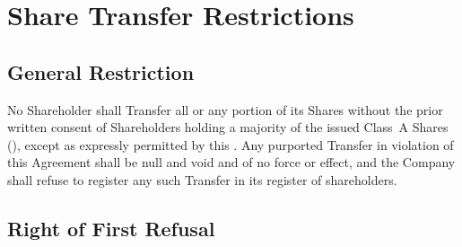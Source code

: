 
\section{Share Transfer Restrictions}
\label{sec:transfer}

\subsection{General Restriction}

No Shareholder shall Transfer all or any portion of its Shares without the prior
written consent of Shareholders holding a majority of the issued Class~A Shares
(), except as expressly permitted by this .
Any purported Transfer in violation of this Agreement shall be null and void and
of no force or effect, and the Company shall refuse to register any such Transfer
in its register of shareholders.

\subsection{Right of First Refusal}

